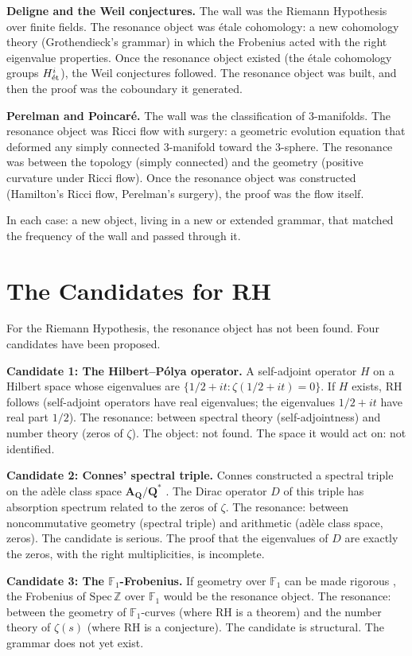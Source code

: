 \documentclass[12pt]{article}
\theoremstyle{definition}
\theoremstyle{remark}
\begin{document}
\textbf{Deligne and the Weil conjectures.}
The wall was the Riemann Hypothesis over finite fields.
The resonance object was \'etale cohomology:
a new cohomology theory (Grothendieck's grammar)
in which the Frobenius acted with the right eigenvalue properties.
Once the resonance object existed (the \'etale cohomology groups $H^i_{\rm\acute{e}t}$),
the Weil conjectures followed.
The resonance object was built, and then the proof was the coboundary it generated.

\textbf{Perelman and Poincar\'e.}
The wall was the classification of 3-manifolds.
The resonance object was Ricci flow with surgery:
a geometric evolution equation that deformed
any simply connected 3-manifold toward the 3-sphere.
The resonance was between the topology (simply connected)
and the geometry (positive curvature under Ricci flow).
Once the resonance object was constructed (Hamilton's Ricci flow, Perelman's surgery),
the proof was the flow itself.

In each case: a new object, living in a new or extended grammar,
that matched the frequency of the wall and passed through it.

\section{The Candidates for RH}

For the Riemann Hypothesis,
the resonance object has not been found.
Four candidates have been proposed.

\textbf{Candidate 1: The Hilbert--P\'olya operator.}
A self-adjoint operator $H$ on a Hilbert space
whose eigenvalues are $\{1/2 + it : \zeta(1/2+it) = 0\}$.
If $H$ exists, RH follows (self-adjoint operators have real eigenvalues;
the eigenvalues $1/2 + it$ have real part $1/2$).
The resonance: between spectral theory (self-adjointness)
and number theory (zeros of $\zeta$).
The object: not found.
The space it would act on: not identified.

\textbf{Candidate 2: Connes' spectral triple.}
Connes constructed a spectral triple on the ad\`ele class space
$\mathbf{A}_\mathbf{Q}/\mathbf{Q}^*$ \cite{connes}.
The Dirac operator $D$ of this triple has absorption spectrum
related to the zeros of $\zeta$.
The resonance: between noncommutative geometry (spectral triple)
and arithmetic (adèle class space, zeros).
The candidate is serious. The proof that the eigenvalues of $D$
are exactly the zeros, with the right multiplicities, is incomplete.

\textbf{Candidate 3: The $\mathbb{F}_1$-Frobenius.}
If geometry over $\mathbb{F}_1$ can be made rigorous \cite{f1},
the Frobenius of $\mathrm{Spec}\,\mathbb{Z}$ over $\mathbb{F}_1$
would be the resonance object.
The resonance: between the geometry of $\mathbb{F}_1$-curves
(where RH is a theorem) and the number theory of $\zeta(s)$
(where RH is a conjecture).
The candidate is structural.
The grammar does not yet exist.
\end{document}
